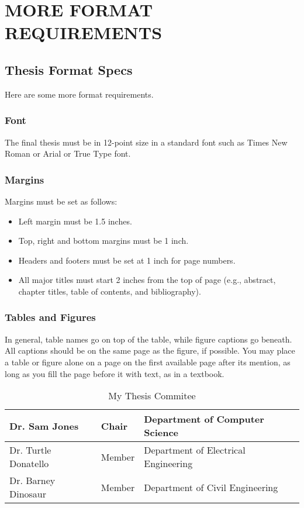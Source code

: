 \chapter{MORE FORMAT REQUIREMENTS}

\section{Thesis Format Specs}

Here are some more format requirements.

\subsection{Font} 
The final thesis must be in 12-point size in a standard font such as Times New Roman or
Arial or True Type font.

\subsection{Margins}
Margins must be set as follows:
\begin{itemize}
\item Left margin must be 1.5 inches.  
\item Top, right and bottom margins must be 1 inch.
\item Headers and footers must be set at 1 inch for page numbers. 
\item All major titles must start 2 inches from the top of page
 (e.g., abstract, chapter titles, table of contents, and bibliography).   
\end{itemize}

\subsection{Tables and Figures}
In general, table names go on top of the table, while figure captions go beneath.
  All captions should be on the same page as the figure, if possible.
 You may place a table or figure alone on a page on the first available page after its mention,
 as long as you fill the page before it with text, as in a textbook. 

\begin{table}
\caption{My Thesis Commitee}
\vspace{.1in}
\label{table-1}
\begin{tabular}{|l|l|l|}\hline
Dr. Sam Jones & Chair & Department of Computer Science \\ \hline
Dr. Turtle Donatello & Member & Department of Electrical Engineering \\ \hline
Dr. Barney Dinosaur  & Member & Department of Civil Engineering \\ \hline
\end{tabular}
\end{table}

